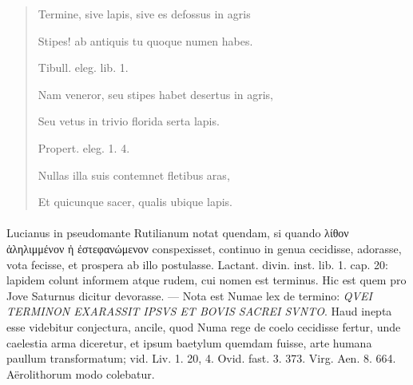 \documentclass[a4paper, 11pt, oneside, polutonikogreek, german]{article}
\begin{document}
\begin{quotation}
\hspace*{10mm}Termine, sive lapis, sive es defossus in agris

\hspace*{15mm}Stipes! ab antiquis tu quoque numen habes.

Tibull. eleg. lib. 1.

\hspace*{10mm}Nam veneror, seu stipes habet desertus in agris,

\hspace*{15mm}Seu vetus in trivio florida serta lapis.

Propert. eleg. 1. 4.

\hspace*{10mm}Nullas illa suis contemnet fletibus aras,

\hspace*{15mm}Et quicunque sacer, qualis ubique lapis.
\end{quotation}
\paragraph{}
Lucianus in pseudomante Rutilianum notat quendam, si quando λίθον ἀληλιμμένον ἠ ἐστεφανώμενον conspexisset, continuo in genua cecidisse, adorasse, vota fecisse, et prospera ab illo postulasse. Lactant. divin. inst. lib. 1. cap. 20: lapidem colunt informem atque rudem, cui nomen est terminus. Hic est quem pro Jove Saturnus dicitur devorasse. --- Nota est Numae lex de termino: \emph{QVEI TERMINON EXARASSIT IPSVS ET BOVIS SACREI SVNTO}. Haud inepta esse videbitur conjectura, ancile, quod Numa rege de coelo cecidisse fertur, unde caelestia arma diceretur, et ipsum baetylum quemdam fuisse, arte humana paullum transformatum; vid. Liv. 1. 20, 4. Ovid. fast. 3. 373. Virg. Aen. 8. 664. Aërolithorum modo colebatur.
\end{document}

